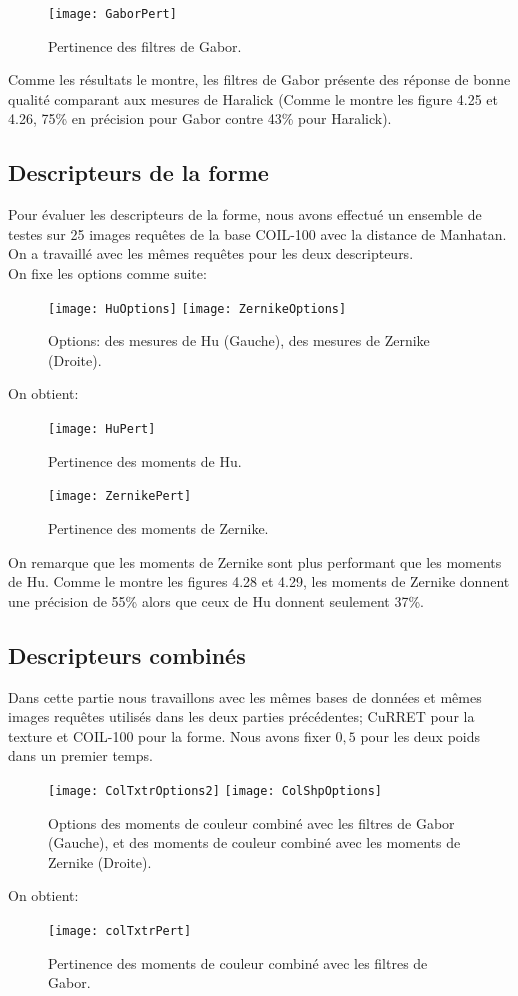 \begin{figure}[H]
	\centering
	\texttt{[image: GaborPert]} 
	\caption{Pertinence des filtres de Gabor.}
\end{figure}
Comme les résultats le montre, les filtres de Gabor présente des réponse de bonne qualité comparant aux mesures de Haralick (Comme le montre les figure 4.25 et 4.26, 75\% en précision pour Gabor contre 43\% pour Haralick). 
\subsection{Descripteurs de la forme}
Pour évaluer les descripteurs de la forme, nous avons effectué un ensemble de testes sur 25 images requêtes de la base COIL-100 avec la distance de Manhatan. On a travaillé avec les mêmes requêtes pour les deux descripteurs.\\

On fixe les options comme suite:
\begin{figure}[H]
	\centering
	\texttt{[image: HuOptions]} \space
	\texttt{[image: ZernikeOptions]} 
	\caption{Options: des mesures de Hu (Gauche), des mesures de Zernike (Droite).}
\end{figure}
On obtient:
\begin{figure}[H]
	\centering
	\texttt{[image: HuPert]} 
	\caption{Pertinence des moments de Hu.}
\end{figure}

\begin{figure}[H]
	\centering
	\texttt{[image: ZernikePert]} 
	\caption{Pertinence des moments de Zernike.}
\end{figure}
On remarque que les moments de Zernike sont plus performant que les moments de Hu. Comme le montre les figures 4.28 et 4.29, les moments de Zernike donnent une précision de 55\% alors que ceux de Hu donnent seulement 37\%.
\subsection{Descripteurs combinés}
Dans cette partie nous travaillons avec les mêmes bases de données et mêmes images requêtes utilisés dans les deux parties précédentes; CuRRET pour la texture et COIL-100 pour la forme. Nous avons fixer $  0,5 $ pour les deux poids dans un premier temps.
\begin{figure}[H]
	\centering
	\texttt{[image: ColTxtrOptions2]} \space
	\texttt{[image: ColShpOptions]} 
	\caption{Options des moments de couleur combiné avec les filtres de Gabor (Gauche), et des moments de couleur combiné avec les moments de Zernike (Droite).}
\end{figure}
On obtient:
\begin{figure}[H]
	\centering
	\texttt{[image: colTxtrPert]} 
	\caption{Pertinence des moments de couleur combiné avec les filtres de Gabor.}
\end{figure}

